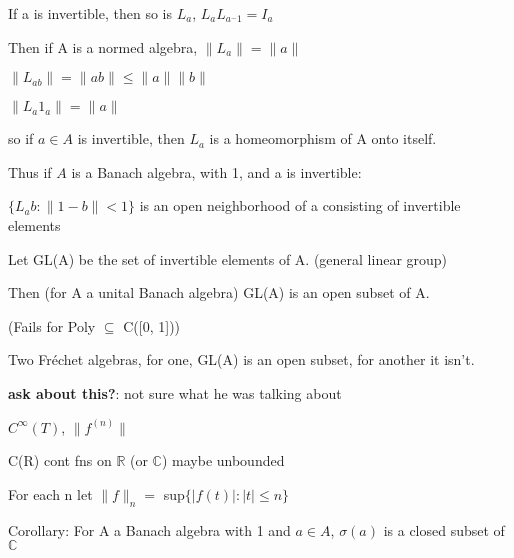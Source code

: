\documentclass[12pt]{article}
\begin{document}
If a is invertible, then so is $L_a$, $L_aL_{a^-1} = I_a$

Then if A is a normed algebra, $\|L_a\| = \|a\|$

$\|L_{ab}\| = \|ab\| \leq \|a\|\|b\|$

$\|L_a1_a\| = \|a\|$

so if $a \in A$ is invertible, then $L_a$ is a homeomorphism of A onto itself.

Thus if $A$ is a Banach algebra, with 1, and a is invertible:

$\{L_{a}b : \|1 - b\| < 1\}$ is an open neighborhood of a consisting of invertible elements

\noindent
Let GL(A) be the set of invertible elements of A. (general linear group)

Then (for A a unital Banach algebra) GL(A) is an open subset of A.

(Fails for Poly $\subseteq$ C([0, 1]))

\noindent
Two Fr\'{e}chet algebras, for one, GL(A) is an open subset, for another it isn't.

\textbf{ask about this?}: not sure what he was talking about

$C^\infty(T)$, $\|f^{(n)}\|$

C(R) cont fns on $\mathds{R}$ (or $\mathds{C}$) maybe unbounded

For each n let $\|f\|_n = $ sup$\{|f(t)|: |t| \leq n\}$


\noindent
Corollary: For A a Banach algebra with 1 and $a \in A$, $\sigma(a)$ is a closed subset of $\mathds{C}$
\end{document}
